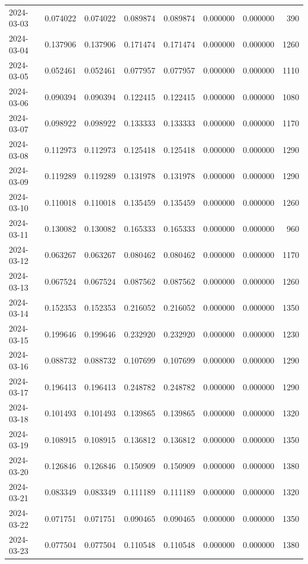 \begin{tabular}{lrrrrrrr}
2024-03-03 & 0.074022 & 0.074022 & 0.089874 & 0.089874 & 0.000000 & 0.000000 & 390 \\
2024-03-04 & 0.137906 & 0.137906 & 0.171474 & 0.171474 & 0.000000 & 0.000000 & 1260 \\
2024-03-05 & 0.052461 & 0.052461 & 0.077957 & 0.077957 & 0.000000 & 0.000000 & 1110 \\
2024-03-06 & 0.090394 & 0.090394 & 0.122415 & 0.122415 & 0.000000 & 0.000000 & 1080 \\
2024-03-07 & 0.098922 & 0.098922 & 0.133333 & 0.133333 & 0.000000 & 0.000000 & 1170 \\
2024-03-08 & 0.112973 & 0.112973 & 0.125418 & 0.125418 & 0.000000 & 0.000000 & 1290 \\
2024-03-09 & 0.119289 & 0.119289 & 0.131978 & 0.131978 & 0.000000 & 0.000000 & 1290 \\
2024-03-10 & 0.110018 & 0.110018 & 0.135459 & 0.135459 & 0.000000 & 0.000000 & 1260 \\
2024-03-11 & 0.130082 & 0.130082 & 0.165333 & 0.165333 & 0.000000 & 0.000000 & 960 \\
2024-03-12 & 0.063267 & 0.063267 & 0.080462 & 0.080462 & 0.000000 & 0.000000 & 1170 \\
2024-03-13 & 0.067524 & 0.067524 & 0.087562 & 0.087562 & 0.000000 & 0.000000 & 1260 \\
2024-03-14 & 0.152353 & 0.152353 & 0.216052 & 0.216052 & 0.000000 & 0.000000 & 1350 \\
2024-03-15 & 0.199646 & 0.199646 & 0.232920 & 0.232920 & 0.000000 & 0.000000 & 1230 \\
2024-03-16 & 0.088732 & 0.088732 & 0.107699 & 0.107699 & 0.000000 & 0.000000 & 1290 \\
2024-03-17 & 0.196413 & 0.196413 & 0.248782 & 0.248782 & 0.000000 & 0.000000 & 1290 \\
2024-03-18 & 0.101493 & 0.101493 & 0.139865 & 0.139865 & 0.000000 & 0.000000 & 1320 \\
2024-03-19 & 0.108915 & 0.108915 & 0.136812 & 0.136812 & 0.000000 & 0.000000 & 1350 \\
2024-03-20 & 0.126846 & 0.126846 & 0.150909 & 0.150909 & 0.000000 & 0.000000 & 1380 \\
2024-03-21 & 0.083349 & 0.083349 & 0.111189 & 0.111189 & 0.000000 & 0.000000 & 1320 \\
2024-03-22 & 0.071751 & 0.071751 & 0.090465 & 0.090465 & 0.000000 & 0.000000 & 1350 \\
2024-03-23 & 0.077504 & 0.077504 & 0.110548 & 0.110548 & 0.000000 & 0.000000 & 1380 \\

\end{tabular}
